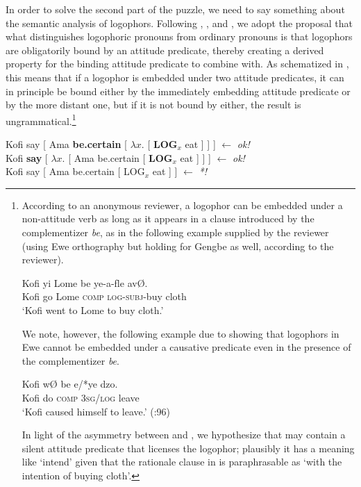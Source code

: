 \documentclass[output=paper,modfonts,nonflat]{langsci/langscibook}
\begin{document}
\largerpage[-2] In order to solve the second part of the puzzle, we need to say something about the semantic analysis of logophors. Following \cite{Heim2002}, \cite{Stechow2009, Stechow2003}, and \cite{Pearson2015}, we adopt the proposal that what distinguishes logophoric pronouns from ordinary pronouns is that logophors are obligatorily bound by an attitude predicate, thereby creating a derived property for the binding attitude predicate to combine with. As schematized in , this means that  if a logophor is embedded under two attitude predicates, it can in principle be bound either by the immediately embedding attitude predicate or by the more distant one, but if it is not bound by either, the result is ungrammatical.\footnote{According to an anonymous reviewer, a logophor can be embedded under a non-attitude verb as long as it appears in a clause introduced by the complementizer \emph{be}, as in the following example supplied by the reviewer (using Ewe orthography but holding for Gengbe as well, according to the reviewer).


\ea \label{ex:grano:reviewerLogophor:28}
\gll Kofi yi Lome be ye-a-ƒle av{\O}.\\
Kofi go Lome \textsc{comp} \textsc{log}-\textsc{subj}-buy cloth\\
\glt `Kofi went to Lome to buy cloth.'
\z

We note, however, the following example due to \cite{Pearson2015} showing that logophors in Ewe cannot be embedded under a causative predicate even in the presence of the complementizer \emph{be}. 

\ea \label{ex:grano:complementizerBe:29}
\gll Kofi w{\O} be e/*ye dzo.\\
Kofi do \textsc{comp} 3\textsc{sg}/\textsc{log} leave\\
\glt `Kofi caused himself to leave.' (\citealt{Pearson2015}:96)
\z

In light of the asymmetry between  and , we hypothesize that  may contain a silent attitude predicate that licenses the logophor; plausibly it has a meaning like `intend' given that the rationale clause in  is paraphrasable as `with the intention of buying cloth'.

}


\ea  \label{ex:grano:log:30}
    \begin{xlist}
    \ex Kofi say [ Ama \textbf{be.certain} [ $\lambda x$. [ \textbf{LOG}$_{x}$ eat ] ] ] \hfill $\leftarrow$ \emph{ok!}\\
    \ex Kofi \textbf{say} [ $\lambda x$. [ Ama be.certain  [ \textbf{LOG}$_{x}$ eat ] ] ] \hfill $\leftarrow$ \emph{ok!} \\
    \ex Kofi say  [ Ama be.certain  [ LOG$_{x}$ eat ] ] \hfill $\leftarrow$ \emph{*!}
    \end{xlist}
\z
\end{document}
